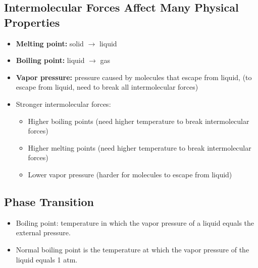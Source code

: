 \documentclass[10pt]{article}
\begin{document}
\subsection*{Intermolecular Forces Affect Many Physical Properties}
\begin{itemize}
    \item \textbf{Melting point:} solid $\rightarrow$ liquid
    \item \textbf{Boiling point:} liquid $\rightarrow$ gas
    \item \textbf{Vapor pressure:} pressure caused by molecules that escape from liquid, (to escape from liquid, need to break all intermolecular forces)
    \item Stronger intermolecular forces:
        \begin{itemize}
            \item Higher boiling points (need higher temperature to break intermolecular forces)
            \item Higher melting points (need higher temperature to break intermolecular forces)
            \item Lower vapor pressure (harder for molecules to escape from liquid)
        \end{itemize}
\end{itemize}

\subsection*{Phase Transition}
\begin{itemize}
    \item Boiling point: temperature in which the vapor pressure of a liquid equals the external pressure.
    \item Normal boiling point is the temperature at which the vapor pressure of the liquid equals 1 atm.
\end{itemize}
\end{document}
